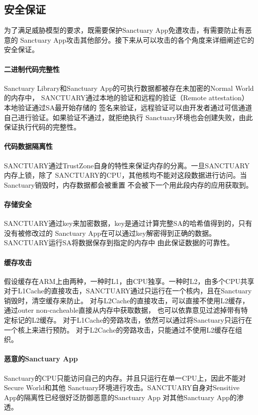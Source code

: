 \subsection{安全保证}
为了满足威胁模型的要求，既需要保护Sanctuary App免遭攻击，有需要防止有恶意的
Sanctuary App攻击其他部分。接下来从可以攻击的各个角度来详细阐述它的安全保证。

\paragraph{二进制代码完整性}
Sanctuary Library和Sanctuary App的可执行数据都被存在未加密的Normal World的内存中，
SANCTUARY通过本地的验证和远程的验证（Remote attestation）本地验证通过SA最开始存储的
签名来验证，远程验证可以由开发者通过可信通道自己进行验证。如果验证不通过，就拒绝执行
Sanctuary环境也会创建失败，由此保证执行代码的完整性。

\paragraph{代码数据隔离性}
SANCTUARY通过TrustZone自身的特性来保证内存的分离。一旦SANCTUARY内存上锁，除了
SANCTUARY的CPU，其他核均不能对这段数据进行访问。当Sanctuary销毁时，内存数据都会被重置
不会被下一个用此段内存的应用获取到。

\paragraph{存储安全}
SANCTUARY通过key来加密数据，key是通过计算完整SA的哈希值得到的，只有没有被修改过的
Sanctuary App在可以通过key解密得到正确的数据。SANCTUARY运行SA将数据保存到指定的内存中
由此保证数据的可靠性。

\paragraph{缓存攻击}
假设缓存在ARM上由两种，一种时L1，由CPU独享。一种时L2，由多个CPU共享
对于L1Cache的直接攻击，SANCTUARY通过只运行在一个核内，且在Sanctuary销毁时，清空缓存来防止。
对与L2Cache的直接攻击，可以直接不使用L2缓存，通过outer non-cacheable直接从内存中获取数据，
也可以依靠意见过滤掉带有特定标记的L2缓存。
对于L1Cache的旁路攻击，依然可以通过将Sanctuary只运行在一个核上来进行预防。
对于L2Cache的旁路攻击，只能通过不使用L2缓存在组织。

\paragraph{恶意的Sanctuary App}
Sanctuary的CPU只能访问自己的内存。并且只运行在单一CPU上，因此不能对Secure World和其他
Sanctuary环境进行攻击。SANCTUARY自身对Sensitive App的隔离性已经很好泛防御恶意的Sanctuary App
对其他Sanctuary App的渗透。

